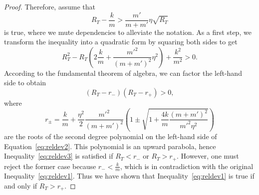 \documentclass[twoside,11pt]{article}
\newcommand{\pr}[1]{\left(#1\right)}
\begin{document}
\begin{proof}
Therefore, assume that 
\begin{equation}\label{eq:reldev1}
    R_{T} - \frac{k}{m} > \frac{m'}{m+m'} \eta \sqrt{R_T}
\end{equation}
is true, where we mute dependencies to alleviate the notation.
As a first step, we transform the inequality into a quadratic form by squaring both sides to get
\begin{equation}\label{eq:reldev2}
    R_T^2 - R_T\pr{2\frac{k}{m}+\frac{m'^2}{(m+m')^2} \eta^2} + \frac{k^2}{m^2} > 0.
\end{equation}
According to the fundamental theorem of algebra, we can factor the left-hand side to obtain
\begin{equation}
   (R_T - r_-)(R_T - r_+) > 0,\label{eq:reldev3}
\end{equation}
where 
\begin{equation}\label{eq:reldev4}
    r_{\pm} = \frac{k}{m} + \frac{\eta^2}{2}\frac{m'^2}{(m+m')^2} \pr{ 1 \pm \sqrt{1 + \frac{4k}{m}\frac{(m+m')^2}{m'^2 \eta^2} } } 
\end{equation}
are the roots of the second degree polynomial on the left-hand side of Equation~\eqref{eq:reldev2}.
This polynomial is an upward parabola, hence Inequality~\eqref{eq:reldev3} is satisfied if $R_T < r_-$ or $R_T > r_+$.
However, one must reject the former case because $r_- < \frac{k}{m}$, which is in contradiction with the original Inequality~\eqref{eq:reldev1}.
Thus we have shown that Inequality~\eqref{eq:reldev1} is true if and only if $R_T > r_+$.


\end{proof}
\end{document}
